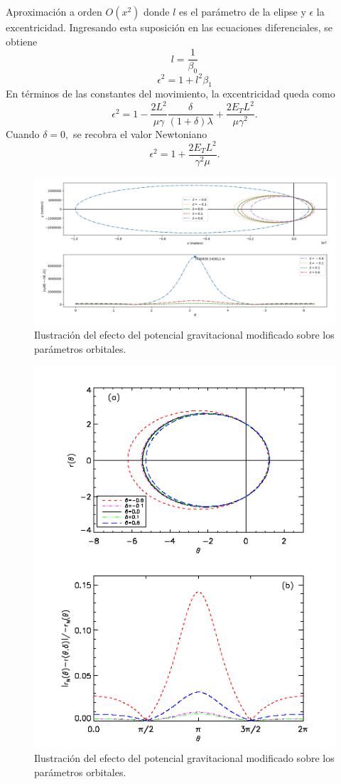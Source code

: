 \documentclass{beamer}
\begin{document}
\begin{frame}[allowframebreaks]{Aproximación a orden $O(x^2)$}
	donde $l$ es el parámetro de la elipse y $\epsilon$ la excentricidad. Ingresando esta suposición en las ecuaciones diferenciales, se obtiene
	\begin{equation}
	l=\frac{1}{\beta_0}
	\end{equation}
	\begin{equation}
	\epsilon^2=1+l^2\beta_1
	\end{equation}
	En términos de las constantes del movimiento, la excentricidad queda como
	\begin{equation}
		\epsilon^2=1-\frac{2L^2}{\mu\gamma}\frac{\delta}{(1+\delta)\lambda}+\frac{2E_TL^2}{\mu\gamma^2}.
	\end{equation}
	Cuando $\delta=0,$ se recobra el valor Newtoniano
	$$\epsilon^2=1+\frac{2E_T L^2}{\gamma^2\mu}.$$
	
	\begin{figure}
	\centering
	\includegraphics[width=1\textwidth]{orbits2.png}
	\caption{Ilustración del efecto del potencial gravitacional modificado sobre los parámetros orbitales.}
	\end{figure}
	
	\begin{figure}
	\centering
	\includegraphics[width=.45\textwidth]{orbits2ref.png}
	\caption{Ilustración del efecto del potencial gravitacional modificado sobre los parámetros orbitales\cite{main}.}
	\end{figure}
	\end{frame}
	
\end{document}
